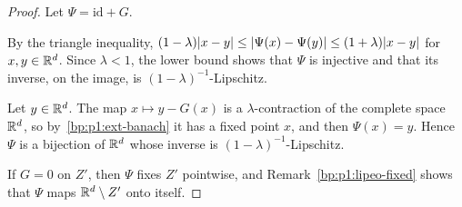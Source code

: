 \begin{proof}
Let $\Psi=\mathrm{id}+G$.

\label{step:p1:lipeo-bounds}
By the triangle inequality, $(1-\lambda)\lvert x-y\rvert\le\lvert \Psi(x)-\Psi(y)\rvert\le(1+\lambda)\lvert x-y\rvert$ for
$x,y\in\mathbb{R}^d$. Since $\lambda<1$, the lower bound shows that $\Psi$ is injective and that its inverse, on
the image, is $(1-\lambda)^{-1}$-Lipschitz.

\label{step:p1:lipeo-onto}
Let $y\in\mathbb{R}^d$. The map $x\mapsto y-G(x)$ is a $\lambda$-contraction of the complete space $\mathbb{R}^d$,
so by~\ref{bp:p1:ext-banach} it has a fixed point $x$, and then $\Psi(x)=y$. Hence $\Psi$ is a bijection
of $\mathbb{R}^d$ whose inverse is $(1-\lambda)^{-1}$-Lipschitz.

\label{step:p1:lipeo-zero}
If $G=0$ on $Z'$, then $\Psi$ fixes $Z'$ pointwise, and Remark~\ref{bp:p1:lipeo-fixed} shows that $\Psi$
maps $\mathbb{R}^d\setminus Z'$ onto itself.
\end{proof}
